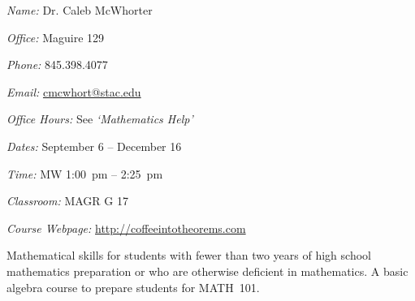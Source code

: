 \documentclass[11pt,letterpaper]{article}
\makeatletter
\newcommand{\classdates}{September 6 -- December 16}
\newcommand{\classtimes}{MW 1:00~pm -- 2:25~pm}
\newcommand{\classroom}{MAGR G 17}
\newcommand{\instructor}{Dr. Caleb McWhorter}
\newcommand{\office}{Maguire 129}
\newcommand{\phone}{845.398.4077}
\newcommand{\email}{cmcwhort@stac.edu}
\newcommand{\website}{http://coffeeintotheorems.com}
\newcommand{\officehours}{See \textit{`Mathematics Help'}}
\makeatother
\begin{document}
\sectionbreak









\textit{Name:} \instructor \par
\textit{Office:} \office \par
\textit{Phone:} \phone \par
\textit{Email:} \href{mailto:\email}{\email} \par
\textit{Office Hours:} \officehours 
\sectionbreak



\textit{Dates:} \classdates \par
\textit{Time:} \classtimes \par
\textit{Classroom:} \classroom \par
\textit{Course Webpage:} \href{\website}{\website}
\sectionbreak



Mathematical skills for students with fewer than two years of high school mathematics preparation or who are otherwise deficient in mathematics. A basic algebra course to prepare students for MATH~101.
\sectionbreak
\end{document}
